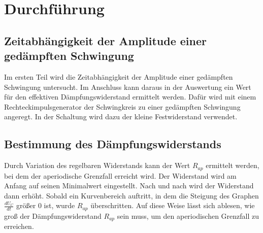 \section{Durchführung}
\label{sec:durchfuehrung}

\subsection{Zeitabhängigkeit der Amplitude einer gedämpften Schwingung}
Im ersten Teil wird die Zeitabhängigkeit der Amplitude einer gedämpften Schwingung untersucht. Im Anschluss kann 
daraus in der Auswertung ein Wert für den effektiven Dämpfungswiderstand ermittelt werden. 
Dafür wird mit einem Rechteckimpulsgenerator der Schwingkreis zu einer gedämpften Schwingung angeregt. %
In der Schaltung wird dazu der kleine Festwiderstand verwendet.

\subsection{Bestimmung des Dämpfungswiderstands}
Durch Variation des regelbaren Widerstands kann der Wert $R_{ap}$ ermittelt werden, bei dem der aperiodische
Grenzfall erreicht wird.
Der Widerstand wird am Anfang auf seinen Minimalwert eingestellt. Nach und nach wird der Widerstand dann erhöht. %
Sobald ein Kurvenbereich auftritt, in dem die Steigung des Graphen $\frac{dU_{C}}{dt}$ größer 0 ist, wurde 
$R_{ap}$ überschritten. Auf diese Weise lässt sich ablesen, wie groß der Dämpfungswiderstand $R_{ap}$
sein muss, um den aperiodischen Grenzfall zu erreichen.

